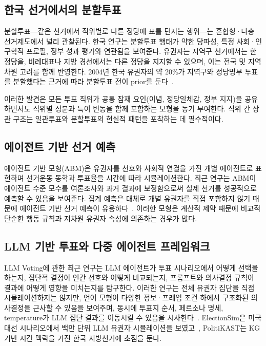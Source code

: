 \documentclass[11pt]{article}
\begin{document}
\subsection{한국 선거에서의 분할투표}

분할투표---같은 선거에서 직위별로 다른 정당에 표를 던지는 행위---는 혼합형·다층 선거제도에서 널리 관찰된다. 한국 연구는 분할투표 행태가 약한 당파성, 특정 사회·인구학적 프로필, 정부 성과 평가와 연관됨을 보여준다. 유권자는 지역구 선거에서는 한 정당을, 비례대표나 지방 경선에서는 다른 정당을 지지할 수 있으며, 이는 전국 및 지역 차원 고려를 함께 반영한다. 2004년 한국 유권자의 약 20\%가 지역구와 정당명부 투표를 분할했다는 근거에 따라 분할투표 전이 prior를 둔다~\cite{splitticket_korea}.

이러한 발견은 모든 투표 직위가 공통 잠재 요인(이념, 정당일체감, 정부 지지)을 공유하면서도 직위별 성분과 특이 변동을 함께 포함하는 모형을 동기 부여한다. 직위 간 상관 구조는 일관투표와 분할투표의 현실적 패턴을 포착하는 데 필수적이다.

\subsection{에이전트 기반 선거 예측}

에이전트 기반 모형(ABM)은 유권자를 선호와 사회적 연결을 가진 개별 에이전트로 표현하며 선거운동 동학과 투표율을 시간에 따라 시뮬레이션한다. 최근 연구는 ABM이 에이전트 수준 모수를 여론조사와 과거 결과에 보정함으로써 실제 선거를 성공적으로 예측할 수 있음을 보여준다. 집계 예측은 대체로 개별 유권자를 직접 포함하지 않기 때문에 에이전트 기반 선거 예측이 유용하다~\cite{gergaud2022abmelections}. 이러한 모형은 계산적 제약 때문에 비교적 단순한 행동 규칙과 저차원 유권자 속성에 의존하는 경우가 많다.

\subsection{LLM 기반 투표와 다중 에이전트 프레임워크}

LLM Voting에 관한 최근 연구는 LLM 에이전트가 투표 시나리오에서 어떻게 선택을 하는지, 집단적 결정이 인간 선호와 어떻게 비교되는지, 프롬프트와 의사결정 규칙이 결과에 어떻게 영향을 미치는지를 탐구한다. 이러한 연구는 전체 유권자 집단을 직접 시뮬레이션하지는 않지만, 언어 모형이 다양한 정보·프레임 조건 하에서 구조화된 의사결정을 근사할 수 있음을 보여주며, 동시에 투표지 순서, 페르소나 명세, temperature가 LLM 집단 결과를 이동시킬 수 있음을 시사한다~\cite{yang2024llmvoting}. ElectionSim은 미국 대선 시나리오에서 백만 단위 LLM 유권자 시뮬레이션을 보였고~\cite{liu2024electionsim}, PolitiKAST는 KG 기반 시간 맥락을 가진 한국 지방선거에 초점을 둔다.
\end{document}
